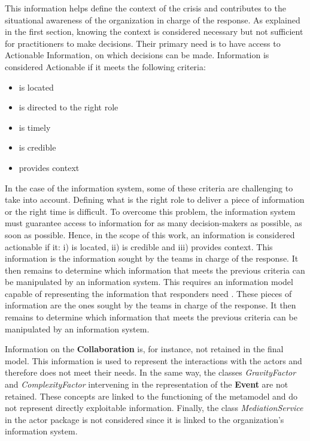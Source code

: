 This information helps define the context of the crisis and contributes to the situational awareness of the organization in charge of the response.
As explained in the first section, knowing the context is considered necessary but not sufficient for practitioners to make decisions.
Their primary need is to have access to Actionable Information, on which decisions can be made.
Information is considered Actionable if it meets the following criteria:

\begin{itemize}
    \item is located
    \item is directed to the right role
    \item is timely
    \item is credible
    \item provides context
\end{itemize}

In the case of the information system, some of these criteria are challenging to take into account.
Defining what is the right role to deliver a piece of information or the right time is difficult.
To overcome this problem, the information system must guarantee access to information for as many decision-makers as possible, as soon as possible.
Hence, in the scope of this work, an information is considered actionable if it: i) is located, ii) is credible and iii) provides context.
This information is the information sought by the teams in charge of the response.
It then remains to determine which information that meets the previous criteria can be manipulated by an information system.
This requires an information model capable of representing the information that responders need \parencite{comesBringingStructureDisaster2015}.
These pieces of information are the ones sought by the teams in charge of the response.
It then remains to determine which information that meets the previous criteria can be manipulated by an information system.

Information on the \textbf{Collaboration} is, for instance, not retained in the final model.
This information is used to represent the interactions with the actors and therefore does not meet their needs.
In the same way, the classes \textit{GravityFactor} and \textit{ComplexityFactor} intervening in the representation of the \textbf{Event} are not retained.
These concepts are linked to the functioning of the \textcite{benabenMetamodelKnowledgeManagement2016} metamodel and do not represent directly exploitable information.
Finally, the class \textit{MediationService} in the actor package is not considered since it is linked to the organization's information system.


